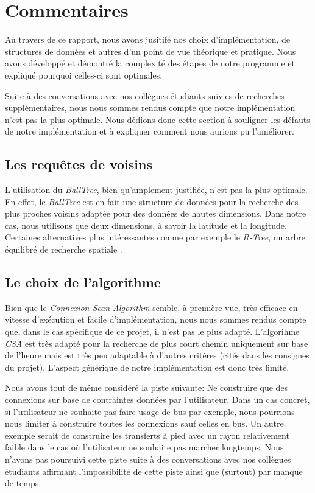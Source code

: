 \documentclass[12pt]{article}
\begin{document}
\section{Commentaires}
Au travers de ce rapport, nous avons jusitifé nos choix d'implémentation, de structures de données et autres d'un point de vue théorique et pratique. Nous avons développé et démontré
la complexité des étapes de notre programme et expliqué pourquoi celles-ci sont optimales. 

Suite à des conversations avec nos collègues étudiants suivies de recherches supplémentaires, nous nous sommes rendus compte que notre implémentation n'est pas la plus optimale. Nous
dédions donc cette section à souligner les défauts de notre implémentation et à expliquer comment nous aurions pu l'améliorer.

\subsection{Les requêtes de voisins}
L'utilisation du \emph{BallTree}, bien qu'amplement justifiée, n'est pas la plus optimale. En effet, le \emph{BallTree} est en fait une structure de données pour la recherche des
plus proches voisins adaptée pour des données de hautes dimensions. Dans notre cas, nous utilisons que deux dimensions, à savoir la latitude et la longitude. Certaines
alternatives plus intéressantes comme par exemple le \emph{R-Tree}, un arbre équilibré de recherche spatiale \cite{RTreedoc}.

\subsection{Le choix de l'algorithme}
Bien que le \emph{Connexion Scan Algorithm} semble, à première vue, très efficace en vitesse d'exécution et facile d'implémentation, nous nous sommes rendus compte que,
dans le cas spécifique de ce projet, il n'est pas le plus adapté. L'algorihme \emph{CSA} est très adapté pour la recherche de plus court chemin uniquement sur base de l'heure
mais est très peu adaptable à d'autres critères (cités dans les consignes du projet). L'aspect générique de notre implémentation est donc très limité.

Nous avons tout de même considéré la piste suivante: Ne construire que des connexions sur base de contraintes données par l'utilisateur. Dans un cas concret, si l'utilisateur ne
souhaite pas faire usage de bus par exemple, nous pourrions nous limiter à construire toutes les connexions sauf celles en bus. Un autre exemple serait de construire
les transferts à pied avec un rayon relativement faible dans le cas où l'utilisateur ne souhaite pas marcher longtemps.
Nous n'avons pas poursuivi cette piste suite à des conversations avec nos collègues étudiants affirmant l'impossibilité de cette piste ainsi que (surtout) par manque de temps.
\end{document}
